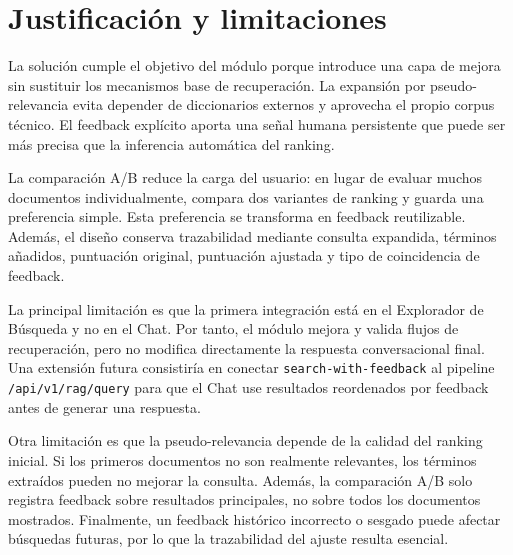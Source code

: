 \documentclass[12pt,a4paper]{article}
\begin{document}
\section{Justificación y limitaciones}

La solución cumple el objetivo del módulo porque introduce una capa de mejora sin sustituir los mecanismos base de recuperación. La expansión por pseudo-relevancia evita depender de diccionarios externos y aprovecha el propio corpus técnico. El feedback explícito aporta una señal humana persistente que puede ser más precisa que la inferencia automática del ranking.

La comparación A/B reduce la carga del usuario: en lugar de evaluar muchos documentos individualmente, compara dos variantes de ranking y guarda una preferencia simple. Esta preferencia se transforma en feedback reutilizable. Además, el diseño conserva trazabilidad mediante consulta expandida, términos añadidos, puntuación original, puntuación ajustada y tipo de coincidencia de feedback.

La principal limitación es que la primera integración está en el Explorador de Búsqueda y no en el Chat. Por tanto, el módulo mejora y valida flujos de recuperación, pero no modifica directamente la respuesta conversacional final. Una extensión futura consistiría en conectar \texttt{search-with-feedback} al pipeline \texttt{/api/v1/rag/query} para que el Chat use resultados reordenados por feedback antes de generar una respuesta.

Otra limitación es que la pseudo-relevancia depende de la calidad del ranking inicial. Si los primeros documentos no son realmente relevantes, los términos extraídos pueden no mejorar la consulta. Además, la comparación A/B solo registra feedback sobre resultados principales, no sobre todos los documentos mostrados. Finalmente, un feedback histórico incorrecto o sesgado puede afectar búsquedas futuras, por lo que la trazabilidad del ajuste resulta esencial.
\end{document}
